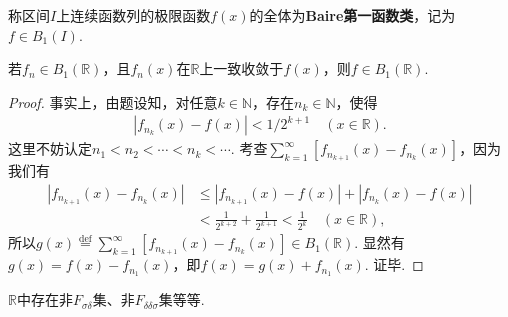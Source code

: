 \documentclass[../../main.tex]{subfiles}
\begin{document}
\begin{definition}[Baire第一函数类]
称区间$I$上连续函数列的极限函数$f(x)$的全体为\textbf{Baire第一函数类}，记为$f\in B_1(I)$.
\end{definition}

\begin{theorem}\label{theorem:Baire第一函数类的性质1}
若$f_n\in B_1(\mathbb{R})$，且$f_n(x)$在$\mathbb{R}$上一致收敛于$f(x)$，则$f\in B_1(\mathbb{R})$.
\end{theorem}
\begin{proof}
事实上，由题设知，对任意$k\in\mathbb{N}$，存在$n_k\in\mathbb{N}$，使得
\begin{align*}
|f_{n_k}(x)-f(x)|<1/2^{k + 1} \quad (x\in\mathbb{R}).
\end{align*}
这里不妨认定$n_1 < n_2 < \cdots < n_k < \cdots$. 考查$\sum_{k = 1}^{\infty}[f_{n_{k + 1}}(x)-f_{n_k}(x)]$，因为我们有
\begin{align*}
|f_{n_{k + 1}}(x)-f_{n_k}(x)| &\leqslant |f_{n_{k + 1}}(x)-f(x)|+|f_{n_k}(x)-f(x)| \\
&<\frac{1}{2^{k + 2}}+\frac{1}{2^{k + 1}}<\frac{1}{2^{k}} \quad (x\in\mathbb{R}),
\end{align*}
所以$g(x)\stackrel{\text{def}}{=}\sum_{k = 1}^{\infty}[f_{n_{k + 1}}(x)-f_{n_k}(x)]\in B_1(\mathbb{R})$. 显然有$g(x)=f(x)-f_{n_1}(x)$，即$f(x)=g(x)+f_{n_1}(x)$. 证毕.
\end{proof}

\begin{proposition}
$\mathbb{R}$中存在非$F_{\sigma\delta}$集、非$F_{\delta\delta\sigma}$集等等. 
\end{proposition}
\end{document}
